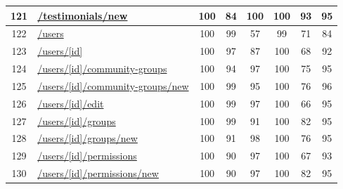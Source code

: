 \begin{longtable}{|c|p{5cm}|c|c|c|c|c|c|}
      \hline
      121                                      & \url{/testimonials/new}                                    & 100              & 84               & 100              & 100              & 93               & 95            \\
      \hline
      122                                      & \url{/users}                                               & 100              & 99               & 57               & 99               & 71               & 84            \\
      \hline
      123                                      & \url{/users/[id]}                                          & 100              & 97               & 87               & 100              & 68               & 92            \\
      \hline
      124                                      & \url{/users/[id]/community-groups}                         & 100              & 94               & 97               & 100              & 75               & 95            \\
      \hline
      125                                      & \url{/users/[id]/community-groups/new}                     & 100              & 99               & 95               & 100              & 76               & 96            \\
      \hline
      126                                      & \url{/users/[id]/edit}                                     & 100              & 99               & 97               & 100              & 66               & 95            \\
      \hline
      127                                      & \url{/users/[id]/groups}                                   & 100              & 99               & 91               & 100              & 82               & 95            \\
      \hline
      128                                      & \url{/users/[id]/groups/new}                               & 100              & 91               & 98               & 100              & 76               & 95            \\
      \hline
      129                                      & \url{/users/[id]/permissions}                              & 100              & 90               & 97               & 100              & 67               & 93            \\
      \hline
      130                                      & \url{/users/[id]/permissions/new}                          & 100              & 90               & 97               & 100              & 82               & 95            \\

\end{longtable}
